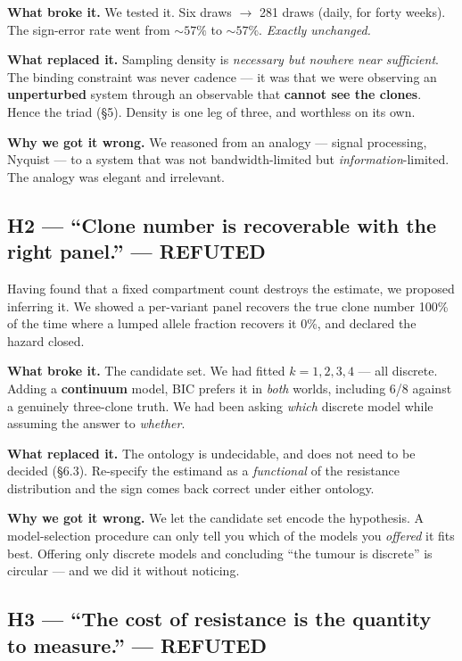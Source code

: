 \documentclass[11pt,a4paper]{article}
\begin{document}
\textbf{What broke it.} We tested it. Six draws $\to$ 281 draws (daily, for forty
weeks). The sign-error rate went from ${\sim}57\%$ to ${\sim}57\%$. \emph{Exactly
unchanged.}

\textbf{What replaced it.} Sampling density is \emph{necessary but nowhere near
sufficient}. The binding constraint was never cadence --- it was that we were
observing an \textbf{unperturbed} system through an observable that \textbf{cannot
see the clones}. Hence the triad (\S5). Density is one leg of three, and worthless on
its own.

\textbf{Why we got it wrong.} We reasoned from an analogy --- signal processing,
Nyquist --- to a system that was not bandwidth-limited but \emph{information}-limited.
The analogy was elegant and irrelevant.

\subsection*{H2 --- ``Clone number is recoverable with the right panel.'' --- \textcolor{red!60!black}{REFUTED}}

Having found that a fixed compartment count destroys the estimate, we proposed
inferring it. We showed a per-variant panel recovers the true clone number 100\% of
the time where a lumped allele fraction recovers it 0\%, and declared the hazard
closed.

\textbf{What broke it.} The candidate set. We had fitted $k = 1, 2, 3, 4$ --- all
discrete. Adding a \textbf{continuum} model, BIC prefers it in \emph{both} worlds,
including 6/8 against a genuinely three-clone truth. We had been asking \emph{which}
discrete model while assuming the answer to \emph{whether}.

\textbf{What replaced it.} The ontology is undecidable, and does not need to be
decided (\S6.3). Re-specify the estimand as a \emph{functional} of the resistance
distribution and the sign comes back correct under either ontology.

\textbf{Why we got it wrong.} We let the candidate set encode the hypothesis. A
model-selection procedure can only tell you which of the models you \emph{offered} it
fits best. Offering only discrete models and concluding ``the tumour is discrete'' is
circular --- and we did it without noticing.

\subsection*{H3 --- ``The cost of resistance is the quantity to measure.'' --- \textcolor{red!60!black}{REFUTED}}
\end{document}
